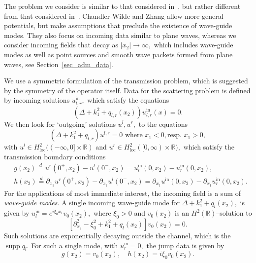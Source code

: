 \documentclass[11pt]{article}
\newcommand{\Rd}{\color{black}}
\newcommand\loc{\operatorname{loc}}
\newcommand\In{\operatorname{in}}
\newcommand\bbR{\mathbb R}
\newcommand\pa{\partial}
\newcommand\supp{\operatorname{supp}}
\theoremstyle{definition}
\theoremstyle{remark}
\begin{document}
The problem we consider is similar to that considered
in~\cite{BonnetBendhia_etal}, but rather different from that considered
in~\cite{ChandlerZhang}. Chandler-Wilde and Zhang allow more general
potentials, but make assumptions that preclude the existence of wave-guide
modes. They also focus on incoming data similar to plane waves, whereas we
consider incoming fields that decay as $|x_2|\to\infty,$ which includes
wave-guide modes as well as point sources and smooth wave packets formed from
plane waves, see Section~\ref{sec_adm_data}.




We use a symmetric formulation of the transmission problem, which
is suggested by the symmetry of the operator itself.
Data for the scattering problem is defined by incoming solutions
$u^{\In}_{l,r},$ which satisfy the equations
\begin{equation}\label{eqn10.702}
  (\Delta+k_1^2+q_{l,r}(x_2))u^{\In}_{l,r}(x)=0.
\end{equation}
We then look for `outgoing' solutions $u^l,u^r,$ to the equations
\begin{equation}\label{eqn5}
  (\Delta+k^2_1+q_{l,r})u^{l,r}=0\text{ where }x_1< 0, \text{
    resp. } x_1>0,
\end{equation}
with $u^l\in H^2_{\loc}( (-\infty,0]\times \bbR)$ and $u^r\in
  H^2_{\loc}([0,\infty) \times\bbR),$ which satisfy the transmission
    boundary conditions
\begin{equation}\label{eqn5.30}
  \begin{split}
    &g(x_2)\overset{d}{=}
    u^r(0^+,x_2)-u^l(0^-,x_2)=u^{\In}_l(0,x_2)-u^{\In}_r(0,x_2),\\ &h(x_2)
    \overset{d}{=}
    \pa_{x_1}u^r(0^+,x_2)-\pa_{x_1}u^l(0^-,x_2)=\pa_{x_1}u^{\In}(0,x_2)-\pa_{x_1}u^{\In}_r(0,x_2).
  \end{split}
\end{equation}\Rd
For the applications of most immediate interest,  the incoming field is
a sum of \emph{wave-guide modes}. A single incoming wave-guide mode for
$\Delta+k_1^2+q_l(x_2),$ is given by $u^{\In}_l=e^{i\xi_0 x_1}v_0(x_2),$
where $\xi_0>0$ and $v_0(x_2)$ is an $H^2(\bbR)$--solution to
\begin{equation}\label{eqn10.210}
  [\pa_{x_2}^2-\xi_0^2+k_1^2+q_{l}(x_2)]v_0(x_2)=0.
\end{equation}
Such solutions are exponentially decaying outside the channel, which is the
$\supp q_l.$ For such a single mode, with $u^{\In}_r=0,$ the jump data is given
by
\begin{equation}\label{eqn15.570}
  g(x_2)=v_0(x_2),\quad h(x_2)=i\xi_0 v_0(x_2).
\end{equation}
\end{document}
